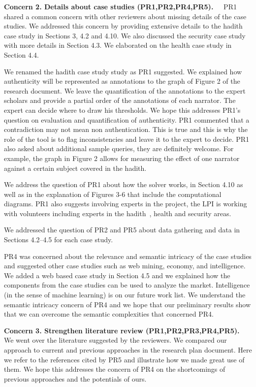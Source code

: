 \documentclass[12pt]{article}
\begin{document}
{\bf Concern 2. Details about case studies (PR1,PR2,PR4,PR5).~~}
PR1 shared a common concern with other reviewers
about missing details of the case studies. 
We addressed this concern by providing extensive details to the
hadith case study in Sections 3, 4.2 and 4.10.
We also discussed the security case study with more details in 
Section 4.3.
We elaborated on the health case study in Section 4.4. 

We renamed the hadith case study study as PR1 suggested. 
We explained how authenticity will be represented as annotations
to the graph of Figure 2 of the research document. 
We leave the quantification of the annotations to the expert
scholars %
and provide a partial order of the annotations of each narrator.
The expert can decide where to draw his thresholds. 
We hope this addresses PR1's question on evaluation and quantification
of authenticity.
PR1 commented that a contradiction may not mean non authentication.
This is true and this is why the role of the tool is to flag 
inconsistencies and leave it to the expert to decide. 
PR1 also asked about additional sample queries, 
they are definitely welcome.
For example, the graph in Figure 2 allows 
for measuring the effect of one narrator 
against a certain subject covered in the hadith. 

We address the question of PR1 about how the solver works, 
in Section 4.10 as well as in the explanation of Figures 3-6 that
include the computational diagrams. 
PR1 also suggests involving experts in the project, the LPI is 
working with volunteers including experts in the hadith~\cite{Zar06},
health and security areas.

We addressed the question of
PR2 and PR5 about data gathering and data
in Sections 4.2--4.5 for each case study. 

PR4 was concerned about the relevance and semantic intricacy 
of the case studies and suggested other case studies such as
web mining, economy, and intelligence. 
We added a web based case study in Section 4.5
and we explained how the components from the case studies 
can be used to analyze the market.
Intelligence (in the sense of machine learning) is on our future 
work list.
We understand the semantic intricacy concern of PR4 and we hope
that our preliminary results show that we can overcome 
the semantic complexities that concerned PR4. 


{\bf Concern 3. Strengthen literature review (PR1,PR2,PR3,PR4,PR5).~~}
We went over the literature suggested by the reviewers. 
We compared our approach to current and previous approaches in the
research plan document. 
Here we refer to the references cited by PR5 and illustrate how
we made great use of them.
We hope this addresses the concern of PR4 on the shortcomings
of previous approaches and the potentials of ours. 
\end{document}
